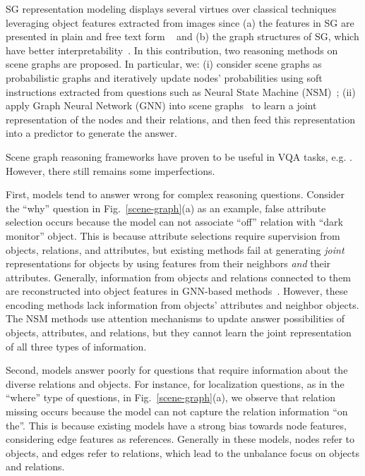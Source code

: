 \documentclass[letterpaper]{article} %
\begin{document}
SG representation modeling displays several virtues over classical techniques leveraging object features extracted from images since (a) the features in SG are presented in plain and free text form ~\cite{DBLP:journals/corr/abs-2101-05479} and (b) the graph structures of SG, which have better interpretability~\cite{DBLP:conf/bmvc/ZhangCX19}.
In this contribution, two reasoning methods on scene graphs are proposed. In particular, we: (i) consider scene graphs as probabilistic graphs and iteratively update nodes' probabilities using soft instructions extracted from questions such as Neural State Machine (NSM)~\cite{DBLP:conf/nips/HudsonM19,DBLP:conf/ijcnn/LeLV020}; (ii) apply Graph Neural Network (GNN) into scene graphs~\cite{inproceedings,DBLP:conf/iccv/LiGCL19} to learn a joint representation of the nodes and their relations, and then feed this representation into a predictor to generate the answer. 

Scene graph reasoning frameworks have proven to be useful in VQA tasks, e.g. \cite{johnson2015image,yang2020prior}. 
However, there still remains some imperfections. 

First, models tend to answer wrong for complex reasoning questions. 
Consider the ``why'' question in Fig.~\ref{scene-graph}(a) as an example, false attribute selection occurs because the model can not associate ``off'' relation with ``dark monitor'' object.
This is because attribute selections require supervision from objects, relations, and attributes, but existing methods fail at generating \emph{joint} representations for objects by using features from their neighbors \emph{and} their attributes. 
Generally, information from objects and relations connected to them are reconstructed into object features in GNN-based methods~\cite{xu2019spatial}. However, these encoding methods lack information from objects' attributes and neighbor objects. 
The NSM methods use attention mechanisms to update answer possibilities of objects, attributes, and relations, but they cannot learn the joint representation of all three types of information. 

Second, models answer poorly for questions that require information about the diverse relations and objects. For instance, for localization questions, as in the ``where'' type of questions, in Fig.~\ref{scene-graph}(a), we observe that relation missing occurs because the model can not capture the relation information ``on the''. This is because existing models have a strong bias towards node features, considering edge features as references. Generally in these models, nodes refer to objects, and edges refer to relations, which lead to the unbalance focus on objects and relations. 
\end{document}
